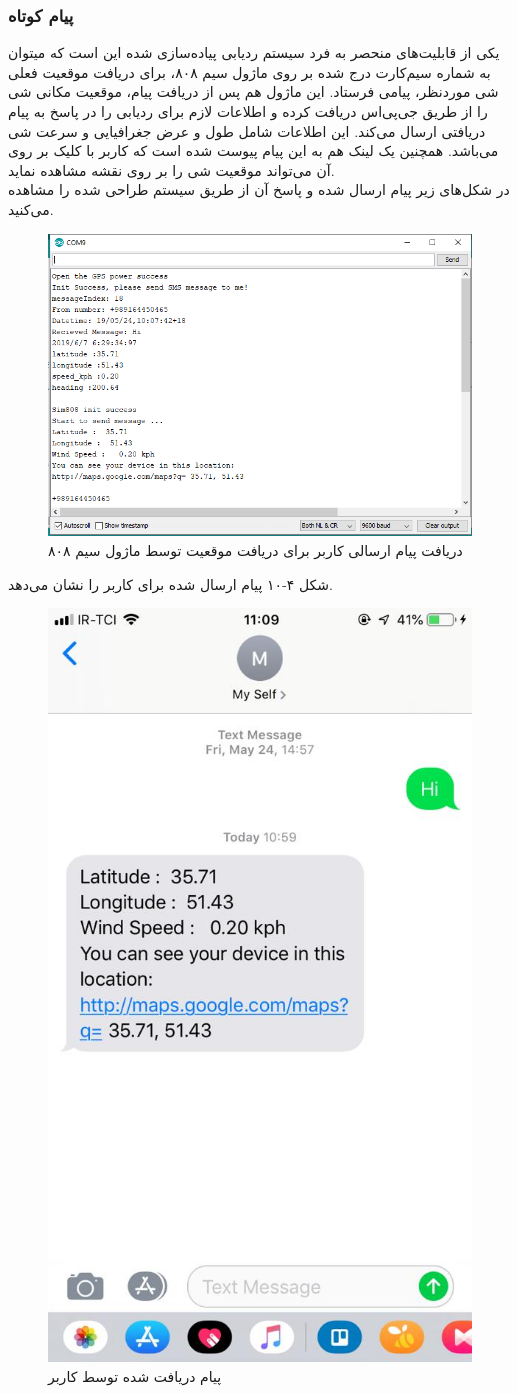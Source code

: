  \subsubsection{پیام کوتاه}
 یکی از قابلیت‌های منحصر به فرد سیستم ردیابی پیاده‌سازی شده این است که میتوان به شماره سیم‌کارت درج شده بر روی ماژول سیم ۸۰۸، برای دریافت موقعیت فعلی شی موردنظر، پیامی فرستاد. این ماژول هم پس از دریافت پیام، موقعیت مکانی شی را از طریق جی‌پی‌اس دریافت کرده و اطلاعات لازم برای ردیابی را در پاسخ به پیام دریافتی ارسال می‌کند. این اطلاعات شامل طول و عرض جغرافیایی و سرعت شی می‌باشد. همچنین یک لینک هم به این پیام پیوست شده است که کاربر با کلیک بر روی آن می‌تواند موقعیت شی را بر روی نقشه مشاهده نماید.\\
در شکل‌های زیر پیام ارسال شده و پاسخ آن از طریق سیستم طراحی شده را مشاهده می‌کنید.\\
 \begin{figure}[!h]
	\centerline{\includegraphics[width=.9\textwidth]{msg}}
	\caption{دریافت پیام ارسالی کاربر برای دریافت موقعیت توسط ماژول سیم ۸۰۸}
\end{figure}
\newpage
شکل ۴-۱۰ پیام ارسال شده برای کاربر را نشان می‌دهد.
 \begin{figure}[!h]
 	\centerline{\includegraphics[width=.3\textwidth]{sms}}
 	\caption{پیام دریافت شده توسط کاربر}
 \end{figure}
